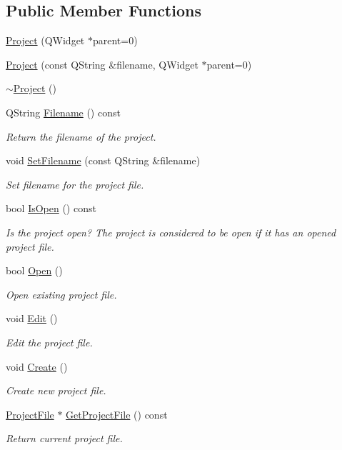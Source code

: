 \subsection*{Public Member Functions}
\begin{DoxyCompactItemize}
\item 
\hyperlink{class_project_ac74a7c157eca257948696824a2d22181}{Project} (Q\-Widget $\ast$parent=0)
\item 
\hyperlink{class_project_a96832b9b3e96cc567c85108e93f52f1c}{Project} (const Q\-String \&filename, Q\-Widget $\ast$parent=0)
\item 
\hyperlink{class_project_ad165d61b76ee86ee9c27fd987a2a7b9e}{$\sim$\-Project} ()
\item 
Q\-String \hyperlink{class_project_aed3d3572acf9a85315557b0f4272d0a9}{Filename} () const 
\begin{DoxyCompactList}\small\item\em Return the filename of the project. \end{DoxyCompactList}\item 
void \hyperlink{class_project_a0a37303738a926439c222d12464e22f6}{Set\-Filename} (const Q\-String \&filename)
\begin{DoxyCompactList}\small\item\em Set filename for the project file. \end{DoxyCompactList}\item 
bool \hyperlink{class_project_ab4b7769f1efd249b8227606f71457df7}{Is\-Open} () const 
\begin{DoxyCompactList}\small\item\em Is the project open? The project is considered to be open if it has an opened project file. \end{DoxyCompactList}\item 
bool \hyperlink{class_project_a45bfe3647ba3320b3f67f4706e68aef5}{Open} ()
\begin{DoxyCompactList}\small\item\em Open existing project file. \end{DoxyCompactList}\item 
void \hyperlink{class_project_a0fb2faa05da235c5cab9bc137a0c8855}{Edit} ()
\begin{DoxyCompactList}\small\item\em Edit the project file. \end{DoxyCompactList}\item 
void \hyperlink{class_project_ad12f3f328253f1562d90318e908045d1}{Create} ()
\begin{DoxyCompactList}\small\item\em Create new project file. \end{DoxyCompactList}\item 
\hyperlink{class_project_file}{Project\-File} $\ast$ \hyperlink{class_project_a86c4eea4f5400e5f921c7f7cb812dfba}{Get\-Project\-File} () const 
\begin{DoxyCompactList}\small\item\em Return current project file. \end{DoxyCompactList}\end{DoxyCompactItemize}


